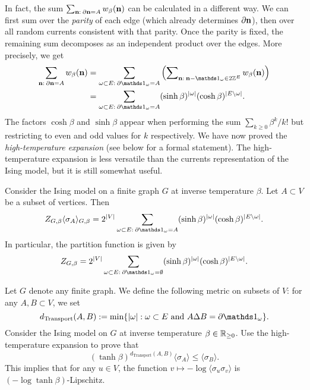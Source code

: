 In fact, the sum
\(\sum_{\mathbf{n}:\:\partial\mathbf{n}=A}
        w_\beta(\mathbf{n})\) can be calculated in a different way.
        We can first sum over the \emph{parity} of each edge 
        (which already determines $\partial\mathbf{n}$),
        then over all random currents consistent with that
        parity.
        Once the parity is fixed, the remaining sum decomposes
        as an independent product over the edges.
        More precisely, we get
        \begin{align}
            \sum_{\n:\:\partial\n=A}
        w_\beta(\n)
       & =
        \sum_{\omega\subset E:\:\partial\ind{\omega}=A}
        \left(\sum\nolimits_{\n:\:\n-\ind{\omega}\in 2\Z^E}
        w_\beta(\n)\right)
        \\
        &=
        \sum_{\omega\subset E:\:\partial\ind{\omega}=A}
        (\sinh\beta)^{|\omega|}(\cosh\beta)^{|E\setminus\omega|}.
        \end{align}
The factors $\cosh\beta$ and $\sinh\beta$ appear when performing the sum
$\sum_{k\geq 0} \beta^k/k!$ but restricting to even and odd values
for $k$ respectively.
We have now proved the \emph{high-temperature expansion}
(see below for a formal statement).
The high-temperature expansion is less versatile than the currents representation
of the Ising model, but it is still somewhat useful.

\begin{theorem}
        \label{thm:High-temperature expansion}
        Consider the Ising model on a finite graph $G$ at inverse temperature $\beta$.
        Let $A\subset V$ be a subset of vertices.
        Then
        \[
            Z_{G,\beta}\langle\sigma_A\rangle_{G,\beta}
            =2^{|V|}\sum_{\omega\subset E:\:\partial\ind{\omega}=A}
            (\sinh\beta)^{|\omega|}(\cosh\beta)^{|E\setminus\omega|}.
        \]
        In particular, the partition function is given by
        \[
            Z_{G,\beta}=2^{|V|}\sum_{\omega\subset E:\:\partial\ind{\omega}=\emptyset}
            (\sinh\beta)^{|\omega|}(\cosh\beta)^{|E\setminus\omega|}.
        \]
\end{theorem}

\begin{exercise}
    \label{exercise:Log-Lipschitz property of correlation functions}
    Let $G$ denote any finite graph.
    We define the following metric on subsets of $V$:
    for any $A,B\subset V$, we set
    \[
        d_{\operatorname{Transport}}(A,B)
        :=
        \min\{|\omega|:\text{$\omega\subset E$ and $A\Delta B=\partial\ind{\omega}$}\}.
    \]
    Consider the Ising model on $G$ at inverse temperature $\beta\in\mathbb R_{\geq 0}$.
    Use the high-temperature expansion to prove that
    \[
        (\tanh\beta)^{d_{\operatorname{Transport}}(A,B)}\langle\sigma_A\rangle
        \leq
        \langle\sigma_B\rangle. 
    \]
    This implies that for any $u\in V$,
    the function $v\mapsto-\log \langle\sigma_u\sigma_v\rangle$ is $(-\log\tanh\beta)$-Lipschitz.
\end{exercise}


